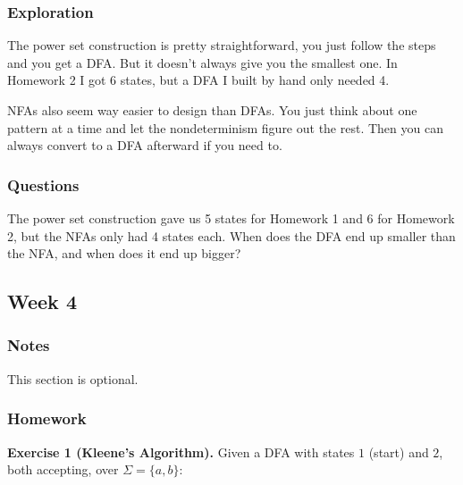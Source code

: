 \documentclass{article}
\theoremstyle{theorem}
\theoremstyle{definition}
\theoremstyle{remark}
\begin{document}
\subsubsection{Exploration}

The power set construction is pretty straightforward, you just follow the steps and you get a DFA. But it doesn't always give you the smallest one. In Homework 2 I got 6 states, but a DFA I built by hand only needed 4.

NFAs also seem way easier to design than DFAs. You just think about one pattern at a time and let the nondeterminism figure out the rest. Then you can always convert to a DFA afterward if you need to.

\subsubsection{Questions}

The power set construction gave us 5 states for Homework 1 and 6 for Homework 2, but the NFAs only had 4 states each. When does the DFA end up smaller than the NFA, and when does it end up bigger?















\subsection{Week 4}

\subsubsection{Notes}

This section is optional. 

\subsubsection{Homework}

\textbf{Exercise 1 (Kleene's Algorithm).}
Given a DFA with states $1$ (start) and $2$, both accepting, over $\Sigma = \{a, b\}$:

\begin{center}
\end{center}
\end{document}
